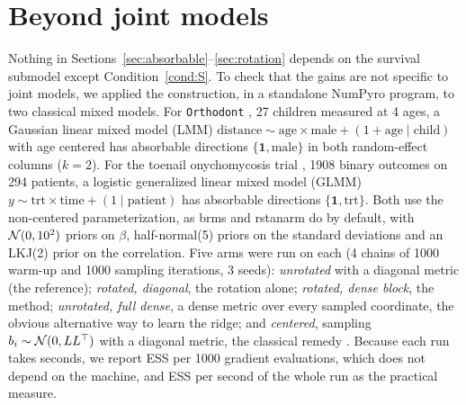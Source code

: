 \section{Beyond joint models}\label{sec:generality}

Nothing in Sections~\ref{sec:absorbable}--\ref{sec:rotation} depends on
the survival submodel except Condition~\ref{cond:S}. To check that the
gains are not specific to joint models, we applied the construction, in a
standalone NumPyro program, to two classical mixed models. For
\texttt{Orthodont} \citep{potthoff1964,pinheiro2000}, 27 children
measured at 4 ages, a Gaussian linear mixed model (LMM) $\text{distance} \sim \text{age}
\times \text{male} + (1 + \text{age} \mid \text{child})$ with age
centered has absorbable directions $\{\mathbf{1}, \mathrm{male}\}$ in both
random-effect columns ($k = 2$). For the toenail onychomycosis trial
\citep{debacker1998,lesaffre2001}, 1908 binary outcomes on 294 patients,
a logistic generalized linear mixed model (GLMM) $y \sim \text{trt} \times \text{time} + (1 \mid
\text{patient})$ has absorbable directions $\{\mathbf{1},
\mathrm{trt}\}$. Both use the non-centered parameterization, as brms and rstanarm do by
default, with $\mathcal{N}(0, 10^2)$ priors on $\beta$, half-normal(5) priors on
the standard deviations and an LKJ(2) prior on the correlation. Five arms
were run on each (4 chains of 1000 warm-up and 1000 sampling iterations, 3
seeds): \emph{unrotated} with a diagonal metric (the reference);
\emph{rotated, diagonal}, the rotation alone; \emph{rotated, dense
block}, the method; \emph{unrotated, full dense}, a dense metric over
every sampled coordinate, the obvious alternative way to learn the ridge;
and \emph{centered}, sampling $b_i \sim \mathcal{N}(0, LL^{\top})$ with a diagonal
metric, the classical remedy \citep{gelfand1995}. Because each run takes
seconds, we report ESS per 1000 gradient evaluations, which does not
depend on the machine, and ESS per second of the whole run as the
practical measure.

